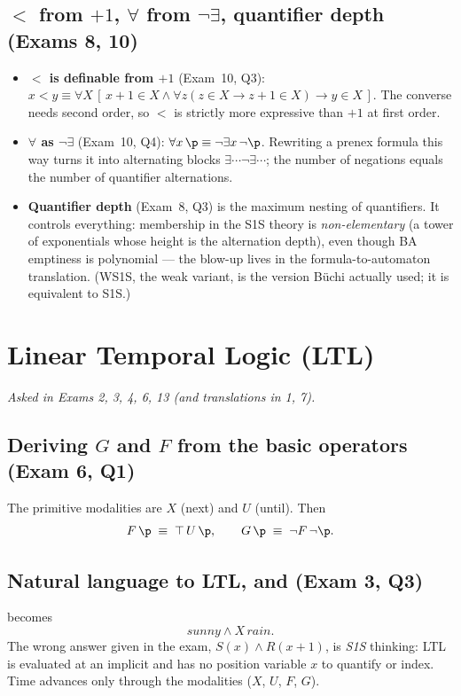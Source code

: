 \documentclass[oneside]{academica}
\begin{document}
\subsection{\texorpdfstring{$<$}{<} from \texorpdfstring{$+1$}{+1}, \texorpdfstring{$\forall$}{forall} from \texorpdfstring{$\neg\exists$}{not-exists}, quantifier depth (Exams 8, 10)}
\begin{itemize}
  \item \textbf{$<$ is definable from $+1$} (Exam~10, Q3):
    $x<y \equiv \forall X\,[\,x{+}1\in X \wedge \forall z(z\in
    X\rightarrow z{+}1\in X)\rightarrow y\in X\,]$. The converse needs
    second order, so $<$ is strictly more expressive than $+1$ at first
    order.
  \item \textbf{$\forall$ as $\neg\exists$} (Exam~10, Q4): $\forall
    x\,\p\equiv\neg\exists x\,\neg\p$. Rewriting a prenex formula this
    way turns it into alternating blocks $\exists\cdots\neg\exists\cdots$;
    the number of negations equals the number of quantifier alternations.
  \item \textbf{Quantifier depth} (Exam~8, Q3) is the maximum nesting of
    quantifiers. It controls everything: membership in the S1S theory is
    \emph{non-elementary} (a tower of exponentials whose height is the
    alternation depth), even though BA emptiness is polynomial --- the
    blow-up lives in the formula-to-automaton translation. (WS1S, the
    weak variant, is the version Büchi actually used; it is equivalent to
    S1S.)
\end{itemize}

\section{Linear Temporal Logic (LTL)}
\emph{Asked in Exams 2, 3, 4, 6, 13 (and translations in 1, 7).}

\subsection{Deriving \texorpdfstring{$G$}{G} and \texorpdfstring{$F$}{F} from the basic operators (Exam 6, Q1)}
The primitive modalities are $X$ (next) and $U$ (until). Then
\[
  F\,\p \;\equiv\; \top\,U\,\p, \qquad G\,\p \;\equiv\; \neg F\,\neg\p .
\]

\subsection{Natural language to LTL, and  (Exam 3, Q3)}
 becomes
\[
  \mathit{sunny}\wedge X\,\mathit{rain}.
\]
The wrong answer given in the exam, $S(x)\wedge R(x{+}1)$, is
\emph{S1S} thinking: LTL is evaluated at an implicit  and has no position variable $x$ to quantify or index. Time
advances only through the modalities ($X$, $U$, $F$, $G$).
\end{document}
